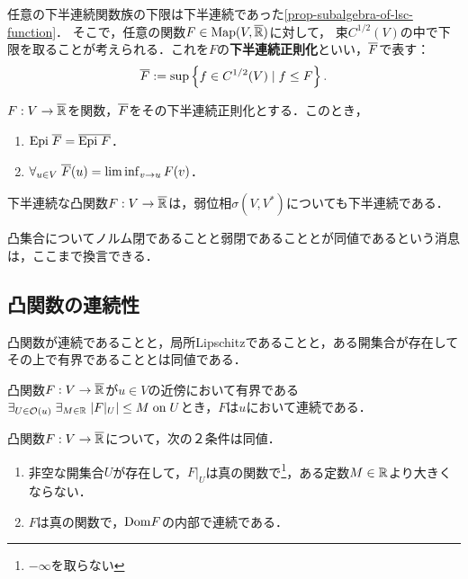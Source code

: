 \documentclass[uplatex,dvipdfmx]{jsreport}
\begin{document}
\begin{definition}
    任意の下半連続関数族の下限は下半連続であった\ref{prop-subalgebra-of-lsc-function}．
    そこで，任意の関数$F\in\mathrm{Map}(V,\overline{\mathbb{R}})$に対して，
    束$C^{1/2}(V)$の中で下限を取ることが考えられる．これを$F$の\textbf{下半連続正則化}といい，$\overline{F}$で表す：
    \[\overline{F}:=\sup\left\{f\in C^{1/2}(V)\mid f\le F\right\}.\]
\end{definition}

\begin{corollary}
    $F:V\to\overline{\mathbb{R}}$を関数，$\overline{F}$をその下半連続正則化とする．このとき，
    \begin{enumerate}
        \item $\mathrm{Epi}\;\overline{F}=\overline{\mathrm{Epi}\; F}$．
        \item $\forall_{u\in V}\;\overline{F}(u)=\liminf_{v\to u}F(v)$．
    \end{enumerate}
\end{corollary}

\begin{corollary}
    下半連続な凸関数$F:V\to\overline{\mathbb{R}}$は，弱位相$\sigma(V,V^*)$についても下半連続である．
\end{corollary}
\begin{remarks}
    凸集合についてノルム閉であることと弱閉であることとが同値であるという消息は，ここまで換言できる．
\end{remarks}

\subsection{凸関数の連続性}

\begin{tcolorbox}[colframe=ForestGreen, colback=ForestGreen!10!white,breakable,colbacktitle=ForestGreen!40!white,coltitle=black,fonttitle=\bfseries\sffamily,
title=]
    凸関数が連続であることと，局所Lipschitzであることと，ある開集合が存在してその上で有界であることとは同値である．
\end{tcolorbox}

\begin{lemma}
    凸関数$F:V\to\overline{\mathbb{R}}$が$u\in V$の近傍において有界である$\exists_{U\in\mathcal{O}(u)}\;\exists_{M\in\mathbb{R}}\;\lvert F|_U\rvert\le M\;\mathrm{on}\; U$とき，$F$は$u$において連続である．
\end{lemma}

\begin{proposition}
    凸関数$F:V\to\overline{\mathbb{R}}$について，次の２条件は同値．
    \begin{enumerate}
        \item 非空な開集合$U$が存在して，$F|_U$は真の関数で\footnote{$-\infty$を取らない}，ある定数$M\in\mathbb{R}$より大きくならない．
        \item $F$は真の関数で，$\mathrm{Dom} F$の内部で連続である．
    \end{enumerate}
\end{proposition}
\end{document}
